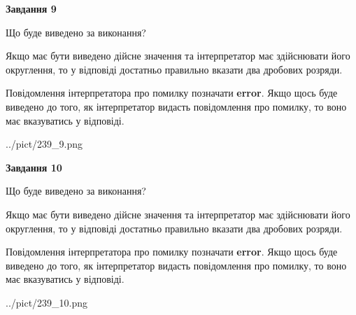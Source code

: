\documentclass[12pt, ukrainian]{article}
\begin{document}
{\begin {Large}
{\begin {center}\textbf{Завдання 9}\end {center}}\par
Що буде виведено за виконання? \par

Якщо має бути виведено дійсне значення та інтерпретатор має здійснювати його округлення, 
то у відповіді достатньо правильно вказати два дробових розряди.

Повідомлення інтерпретатора про помилку позначати \textbf{error}.
Якщо щось буде виведено до того, як інтерпретатор видасть повідомлення про помилку, 
то воно має вказуватись у відповіді. \par

\begin{center}
	{../pict/239_9.png}
\end{center}
\newpage

{\begin {center}\textbf{Завдання 10}\end {center}}\par
Що буде виведено за виконання? \par

Якщо має бути виведено дійсне значення та інтерпретатор має здійснювати його округлення, 
то у відповіді достатньо правильно вказати два дробових розряди.

Повідомлення інтерпретатора про помилку позначати \textbf{error}.
Якщо щось буде виведено до того, як інтерпретатор видасть повідомлення про помилку, 
то воно має вказуватись у відповіді. \par

\begin{center}
	{../pict/239_10.png}
\end{center}
\newpage

\end {Large}}
\end{document}
